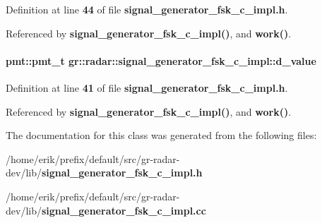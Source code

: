 Definition at line {\bf 44} of file {\bf signal\+\_\+generator\+\_\+fsk\+\_\+c\+\_\+impl.\+h}.



Referenced by {\bf signal\+\_\+generator\+\_\+fsk\+\_\+c\+\_\+impl()}, and {\bf work()}.

\paragraph[{d\+\_\+value}]{\setlength{\rightskip}{0pt plus 5cm}pmt\+::pmt\+\_\+t gr\+::radar\+::signal\+\_\+generator\+\_\+fsk\+\_\+c\+\_\+impl\+::d\+\_\+value}\label{classgr_1_1radar_1_1signal__generator__fsk__c__impl_ae299986974906a1a0add3770b937c48a}


Definition at line {\bf 41} of file {\bf signal\+\_\+generator\+\_\+fsk\+\_\+c\+\_\+impl.\+h}.



Referenced by {\bf signal\+\_\+generator\+\_\+fsk\+\_\+c\+\_\+impl()}, and {\bf work()}.



The documentation for this class was generated from the following files\+:\begin{DoxyCompactItemize}
\item 
/home/erik/prefix/default/src/gr-\/radar-\/dev/lib/{\bf signal\+\_\+generator\+\_\+fsk\+\_\+c\+\_\+impl.\+h}\item 
/home/erik/prefix/default/src/gr-\/radar-\/dev/lib/{\bf signal\+\_\+generator\+\_\+fsk\+\_\+c\+\_\+impl.\+cc}\end{DoxyCompactItemize}
